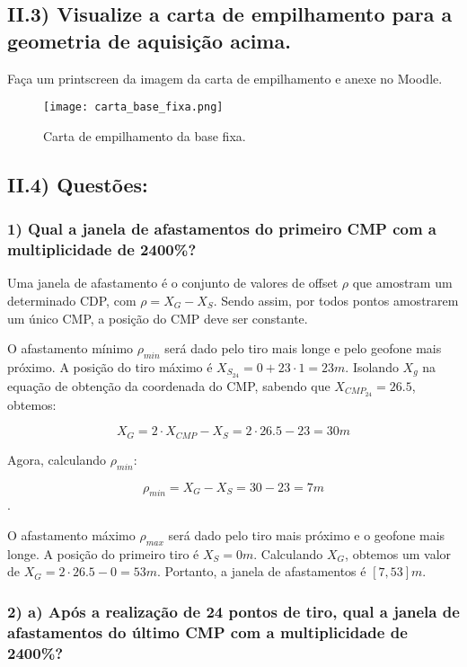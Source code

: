 \documentclass[12pt,a4paper]{article}
\begin{document}
\subsection{II.3) Visualize a carta de empilhamento para a geometria de aquisição acima.}
Faça um printscreen da imagem da carta de empilhamento e anexe no Moodle.


\begin{figure}[h]
    \centering
    \texttt{[image: carta\_base\_fixa.png]}
    \caption{Carta de empilhamento da base fixa.}
    \label{fig:placeholder}
\end{figure}

\subsection{II.4) Questões:}

\subsubsection{1) Qual a janela de afastamentos do primeiro CMP com a multiplicidade de 2400\%?}

Uma janela de afastamento é o conjunto de valores de offset $\rho$ que amostram um determinado CDP, com $\rho = X_G  - X_S$. Sendo assim, por todos pontos amostrarem um único CMP, a posição do CMP deve ser constante. 

O afastamento mínimo $\rho_{min}$ será dado pelo tiro mais longe e pelo geofone mais próximo. A posição do tiro máximo é $X_{S_{24}} = 0 + 23 \cdot 1 = 23m$. Isolando $X_g$ na equação de obtenção da coordenada do CMP, sabendo que $X_{CMP_{24}} = 26.5$, obtemos:

$$X_G = 2\cdot X_{CMP} - X_S = 2 \cdot 26.5 - 23 = 30m$$

Agora, calculando $\rho_{min}$:

$$ \rho_{min} = X_G - X_S = 30 - 23 = 7m$$. 



O afastamento máximo $\rho_{max}$ será dado pelo tiro mais próximo e o geofone mais longe. A posição do primeiro tiro é $X_S = 0m$. Calculando $X_G$, obtemos um valor de $X_G = 2 \cdot 26.5 - 0 = 53m$. Portanto, a janela de afastamentos é $[7, 53]m$.


\subsubsection{2) a) Após a realização de 24 pontos de tiro, qual a janela de afastamentos do último CMP com a multiplicidade de 2400\%?}
\end{document}
